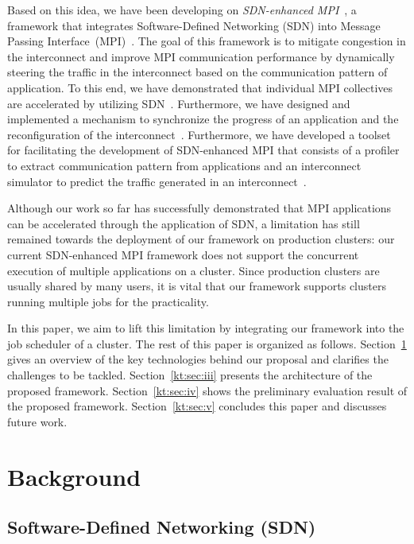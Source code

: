 \documentclass[graybox]{svmult}
\begin{document}
Based on this idea, we have been developing on \textit{SDN-enhanced
MPI}~\cite{Date2016}, a framework that integrates Software-Defined Networking
(SDN) into Message Passing Interface~(MPI)~\cite{MPIForum2012}. The goal of
this framework is to mitigate congestion in the interconnect and improve MPI
communication performance by dynamically steering the traffic in the
interconnect based on the communication pattern of application. To this end,
we have demonstrated that individual MPI collectives are accelerated by
utilizing SDN~\cite{Dashdavaa2014,Takahashi2014}. Furthermore, we have
designed and implemented a mechanism to synchronize the progress of an
application and the reconfiguration of the
interconnect~\cite{Takahashi2015,Takahashi2018}. Furthermore, we have
developed a toolset for facilitating the development of SDN-enhanced MPI that
consists of a profiler to extract communication pattern from applications and
an interconnect simulator to predict the traffic generated in an
interconnect~\cite{Takahashi2017}.

Although our work so far has successfully demonstrated that MPI applications
can be accelerated through the application of SDN, a limitation has still
remained towards the deployment of our framework on production clusters: our
current SDN-enhanced MPI framework does not support the concurrent execution
of multiple applications on a cluster. Since production clusters are usually
shared by many users, it is vital that our framework supports clusters running
multiple jobs for the practicality.

In this paper, we aim to lift this limitation by integrating our framework
into the job scheduler of a cluster. The rest of this paper is organized as
follows. Section~\ref{kt:sec:ii} gives an overview of the key technologies
behind our proposal and clarifies the challenges to be tackled.
Section~\ref{kt:sec:iii} presents the architecture of the proposed framework.
Section~\ref{kt:sec:iv} shows the preliminary evaluation result of the
proposed framework. Section~\ref{kt:sec:v} concludes this paper and discusses
future work.

\section{Background}\label{kt:sec:ii}

\subsection{Software-Defined Networking (SDN)}
\end{document}
